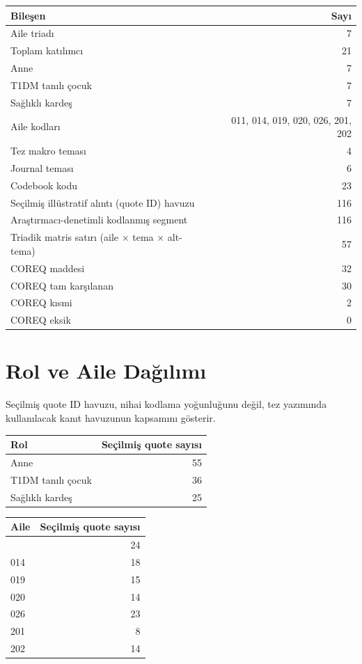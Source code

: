 \documentclass[
  turkish,
  a4paper,
  DIV=11,
  numbers=noendperiod]{scrreprt}
\newcounter{none} %
\begin{document}
{\def\LTcaptype{none} %
\begin{longtable}[]{@{}lr@{}}
\toprule\noalign{}
Bileşen & Sayı \\
\midrule\noalign{}
\endhead
\bottomrule\noalign{}
\endlastfoot
Aile triadı & 7 \\
Toplam katılımcı & 21 \\
Anne & 7 \\
T1DM tanılı çocuk & 7 \\
Sağlıklı kardeş & 7 \\
Aile kodları & 011, 014, 019, 020, 026, 201, 202 \\
Tez makro teması & 4 \\
Journal teması & 6 \\
Codebook kodu & 23 \\
Seçilmiş illüstratif alıntı (quote ID) havuzu & 116 \\
Araştırmacı-denetimli kodlanmış segment & 116 \\
Triadik matris satırı (aile × tema × alt-tema) & 57 \\
COREQ maddesi & 32 \\
COREQ tam karşılanan & 30 \\
COREQ kısmi & 2 \\
COREQ eksik & 0 \\
\end{longtable}
}

\section{Rol ve Aile
Dağılımı}\label{rol-ve-aile-daux11fux131lux131mux131}

Seçilmiş quote ID havuzu, nihai kodlama yoğunluğunu değil, tez yazımında
kullanılacak kanıt havuzunun kapsamını gösterir.

{\def\LTcaptype{none} %
\begin{longtable}[]{@{}lr@{}}
\toprule\noalign{}
Rol & Seçilmiş quote sayısı \\
\midrule\noalign{}
\endhead
\bottomrule\noalign{}
\endlastfoot
Anne & 55 \\
T1DM tanılı çocuk & 36 \\
Sağlıklı kardeş & 25 \\
\end{longtable}
}

{\def\LTcaptype{none} %
\begin{longtable}[]{@{}lr@{}}
\toprule\noalign{}
Aile & Seçilmiş quote sayısı \\
\midrule\noalign{}
\endhead
\bottomrule\noalign{}
\endlastfoot
011 & 24 \\
014 & 18 \\
019 & 15 \\
020 & 14 \\
026 & 23 \\
201 & 8 \\
202 & 14 \\
\end{longtable}
}
\end{document}
